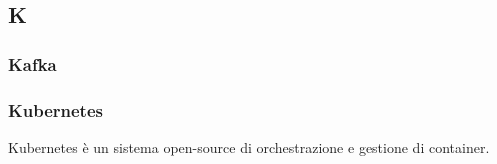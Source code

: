 \subsection*{\textbf{\hfill \Huge{K} \hfill}} 
\subsubsection*{Kafka}

\subsubsection*{Kubernetes}
Kubernetes  è un sistema open-source di orchestrazione e gestione di container.

